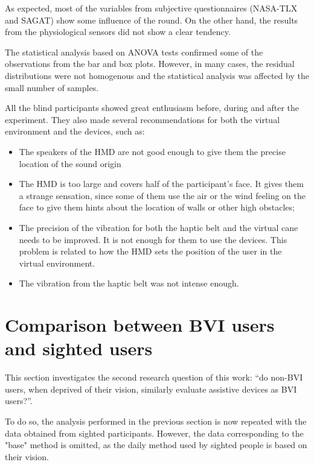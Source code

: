 As expected, most of the variables from subjective questionnaires (NASA-TLX and SAGAT) show some influence of the round. On the other hand, the results from the physiological sensors did not show a clear tendency. 

The statistical analysis based on ANOVA tests confirmed some of the observations from the bar and box plots. However, in many cases, the residual distributions were not homogenous and the statistical analysis was affected by the small number of samples. 

All the blind participants showed great enthusiasm before, during and after the experiment. They also made several recommendations for both the virtual environment and the devices, such as:

\begin{itemize}
    \item The speakers of the HMD are not good enough to give them the precise location of the sound origin
    \item The HMD is too large and covers half of the participant's face. It gives them a strange sensation, since some of them use the air or the wind feeling on the face to give them hints about the location of walls or other high obstacles;
    \item The precision of the vibration for both the haptic belt and the virtual cane needs to be improved. It is not enough for them to use the devices. This problem is related to how the HMD sets the position of the user in the virtual environment. \\    
    \item The vibration from the haptic belt was not intense enough.
\end{itemize}

\section{Comparison between BVI users and sighted users}
\label{sec:results_obj_2}

This section investigates the second research question of this work: “do non-BVI users, when deprived of their vision, similarly evaluate assistive devices as BVI users?”. 

To do so, the analysis performed in the previous section is now repeated with the data obtained from sighted participants. However, the data corresponding to the "base" method is omitted, as the daily method used by sighted people is based on their vision.

